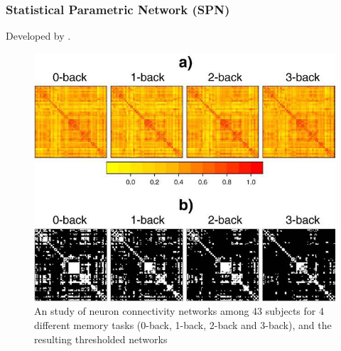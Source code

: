 \documentclass{beamer}
\begin{document}
\begin{frame}
    \frametitle{Statistical Parametric Network (SPN)}
    Developed by .
    \begin{figure}
        \centering
        \includegraphics[width=.5\textwidth]{figures/thresholded_adjacency.png}
        \caption*{An study of neuron connectivity
            networks among 43 subjects for 4 different memory tasks 
            (0-back, 1-back, 2-back and 3-back), and the
            resulting thresholded networks \cite{ginestet2011statistical}}
        \label{fig:thresholded_adjacency}
    \end{figure}
\end{frame}
\end{document}
